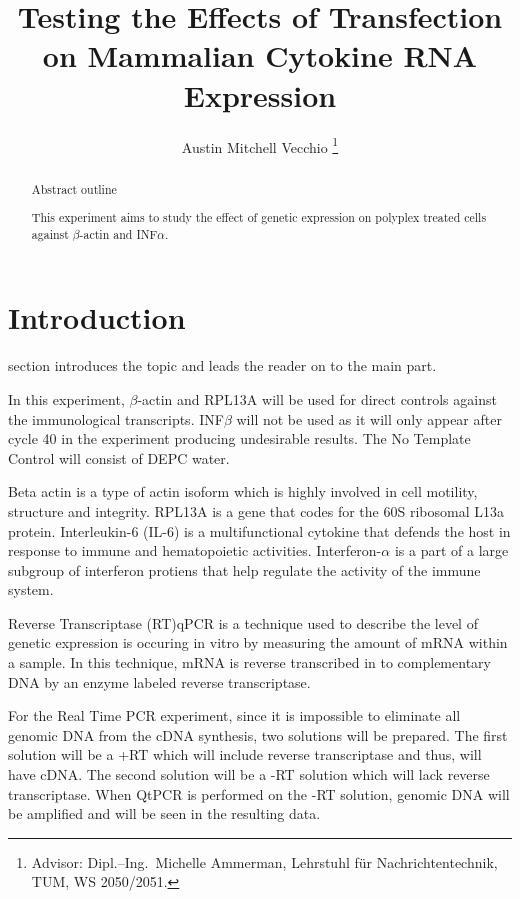 \documentclass[journal, a4paper]{IEEEtran}
\begin{document}
\title{Testing the Effects of Transfection on Mammalian Cytokine RNA Expression}
\author{Austin Mitchell Vecchio
\thanks{Advisor: Dipl.--Ing.~Michelle Ammerman, Lehrstuhl f\"ur Nachrichtentechnik, TUM, WS 2050/2051.}}
\maketitle

\begin{abstract}
  Abstract outline

  This experiment aims to study the effect of genetic expression on polyplex treated cells against $\beta$-actin and INF$\alpha$.

\end{abstract}

\section{Introduction}
     section introduces the topic and leads the reader on to the main part.

In this experiment, $\beta$-actin and RPL13A will be used for direct controls against the immunological transcripts.
INF$\beta$ will not be used as it will only appear after cycle 40 in the experiment producing undesirable results.
The No Template Control will consist of DEPC water.

Beta actin is a type of actin isoform which is highly involved in cell motility, structure and integrity.
RPL13A is a gene that codes for the 60S ribosomal L13a protein.
Interleukin-6 (IL-6) is a multifunctional cytokine that defends the host in response to immune and hematopoietic activities.
Interferon-$\alpha$ is a part of a large subgroup of interferon protiens that help regulate the activity of the immune system.

Reverse Transcriptase (RT)qPCR is a technique used to describe the level of genetic expression is occuring in vitro
by measuring the amount of mRNA within a sample. In this technique, mRNA is reverse transcribed in to complementary DNA by
an enzyme labeled reverse transcriptase.

For the Real Time PCR experiment, since it is impossible to eliminate all genomic DNA from the cDNA synthesis, two solutions will be prepared. The first solution will be a +RT which will include reverse transcriptase and thus, will have cDNA.
The second solution will be a -RT solution which will lack reverse transcriptase. When QtPCR is performed on the -RT solution, genomic DNA will be amplified and will be seen in the resulting data.
\end{document}
